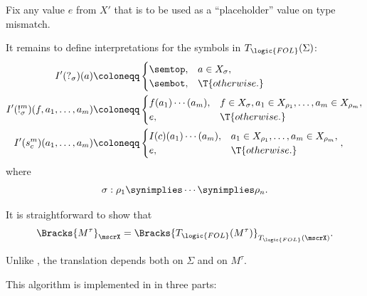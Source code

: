 \begin{algorithm}
\begin{thmenum}
\begin{thmenum}
       Fix any value \( e \) from \( X' \) that is to be used as a \enquote{placeholder} value on type mismatch.

       It remains to define interpretations for the symbols in \( T_{\logic{FOL}}(\Sigma) \):
      \begin{align*}
        I'(?_\sigma)(a) &\coloneqq \begin{cases}
          \semtop, &a \in X_\sigma, \\
          \sembot, &\T{otherwise.}
        \end{cases}
        \\
        I'(!_\sigma^m)(f, a_1, \ldots, a_m) &\coloneqq \begin{cases}
          f(a_1) \cdots (a_m), &f \in X_\sigma, a_1 \in X_{\rho_1}, \ldots, a_m \in X_{\rho_m}, \\
          e,                   &\T{otherwise.}
        \end{cases}
        \\
        I'(s_c^m)(a_1, \ldots, a_m) &\coloneqq \begin{cases}
          I(c)(a_1) \cdots (a_m), &a_1 \in X_{\rho_1}, \ldots, a_m \in X_{\rho_m}, \\
          e,                      &\T{otherwise.}
        \end{cases},
      \end{align*}
      where
      \begin{equation*}
        \sigma: \rho_1 \synimplies \cdots \synimplies \rho_n.
      \end{equation*}
    \end{thmenum}

    It is straightforward to show that
    \begin{equation*}
      \Bracks{ M^\tau }_\mscrX = \Bracks{ T_{\logic{FOL}}(M^\tau) }_{T_{\logic{FOL}}(\mscrX)}.
    \end{equation*}
  \end{thmenum}
\end{algorithm}
\begin{comments}
  \item Unlike , the translation depends both on \( \Sigma \) and on \( M^\tau \).

  \item This algorithm is implemented in \cite{notebook:code} in three parts:
  \begin{CodeRefDisplay}
     \\
     \\
  \end{CodeRefDisplay}
\end{comments}

